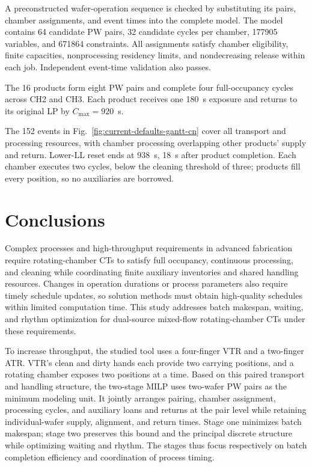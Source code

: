 \documentclass[final,5p,times,twocolumn]{elsarticle}
\begin{document}
A preconstructed wafer-operation sequence is checked by substituting its pairs, chamber assignments, and event times into the complete model. The model contains 64 candidate PW pairs, 32 candidate cycles per chamber, 177905 variables, and 671864 constraints. All assignments satisfy chamber eligibility, finite capacities, nonprocessing residency limits, and nondecreasing release within each job. Independent event-time validation also passes.

The 16 products form eight PW pairs and complete four full-occupancy cycles across CH2 and CH3. Each product receives one 180~s exposure and returns to its original LP by $C_{\max}=920$~s.

The 152 events in Fig.~\ref{fig:current-defaults-gantt-cn} cover all transport and processing resources, with chamber processing overlapping other products' supply and return. Lower-LL reset ends at 938~s, 18~s after product completion. Each chamber executes two cycles, below the cleaning threshold of three; products fill every position, so no auxiliaries are borrowed.

\FloatBarrier
\section{Conclusions}
Complex processes and high-throughput requirements in advanced fabrication require rotating-chamber CTs to satisfy full occupancy, continuous processing, and cleaning while coordinating finite auxiliary inventories and shared handling resources. Changes in operation durations or process parameters also require timely schedule updates, so solution methods must obtain high-quality schedules within limited computation time. This study addresses batch makespan, waiting, and rhythm optimization for dual-source mixed-flow rotating-chamber CTs under these requirements.

To increase throughput, the studied tool uses a four-finger VTR and a two-finger ATR. VTR's clean and dirty hands each provide two carrying positions, and a rotating chamber exposes two positions at a time. Based on this paired transport and handling structure, the two-stage MILP uses two-wafer PW pairs as the minimum modeling unit. It jointly arranges pairing, chamber assignment, processing cycles, and auxiliary loans and returns at the pair level while retaining individual-wafer supply, alignment, and return times. Stage one minimizes batch makespan; stage two preserves this bound and the principal discrete structure while optimizing waiting and rhythm. The stages thus focus respectively on batch completion efficiency and coordination of process timing.
\end{document}
